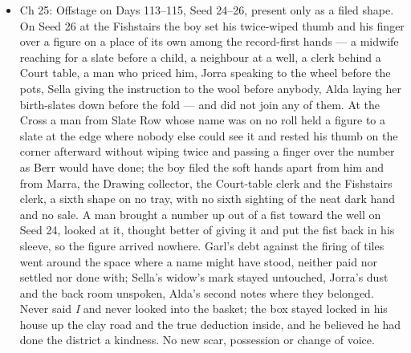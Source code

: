 \documentclass{design/chronicle}
\begin{document}
{\begin{itemize}[leftmargin=1.4em,itemsep=1pt,topsep=3pt,parsep=0pt]
\item Ch 25: Offstage on Days 113–115, Seed 24–26, present only as a filed shape. On Seed 26 at the Fishstairs the boy set his twice-wiped thumb and his finger over a figure on a place of its own among the record-first hands — a midwife reaching for a slate before a child, a neighbour at a well, a clerk behind a Court table, a man who priced him, Jorra speaking to the wheel before the pots, Sella giving the instruction to the wool before anybody, Alda laying her birth-slates down before the fold — and did not join any of them. At the Cross a man from Slate Row whose name was on no roll held a figure to a slate at the edge where nobody else could see it and rested his thumb on the corner afterward without wiping twice and passing a finger over the number as Berr would have done; the boy filed the soft hands apart from him and from Marra, the Drawing collector, the Court-table clerk and the Fishstairs clerk, a sixth shape on no tray, with no sixth sighting of the neat dark hand and no sale. A man brought a number up out of a fist toward the well on Seed 24, looked at it, thought better of giving it and put the fist back in his sleeve, so the figure arrived nowhere. Garl’s debt against the firing of tiles went around the space where a name might have stood, neither paid nor settled nor done with; Sella’s widow’s mark stayed untouched, Jorra’s dust and the back room unspoken, Alda’s second notes where they belonged. Never said \emph{I} and never looked into the basket; the box stayed locked in his house up the clay road and the true deduction inside, and he believed he had done the district a kindness. No new scar, possession or change of voice.

\end{itemize}

\begin{itemize}[leftmargin=1.4em,itemsep=1pt,topsep=3pt,parsep=0pt]


\end{itemize}}
\end{document}
